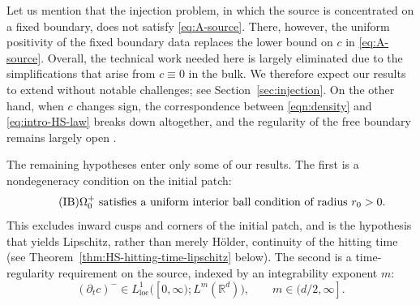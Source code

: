 \documentclass[11pt]{amsart}
\numberwithin{equation}{section}
\numberwithin{figure}{section}
\theoremstyle{plain}
\theoremstyle{definition}
\theoremstyle{remark}
\theoremstyle{plain}
\def\R{\mathbb{R}}
\begin{document}
Let us mention that the injection problem, in which the source is concentrated on a fixed
boundary, does not satisfy \eqref{eq:A-source}. There, however, the uniform positivity of
the fixed boundary data replaces the lower bound on $c$ in \eqref{eq:A-source}. Overall, the technical work needed here is largely eliminated due to the simplifications that arise from \(c\equiv0\) in the bulk. We therefore expect our results to extend
without notable challenges; see Section~\ref{sec:injection}. On the other hand, when $c$ changes sign, the
correspondence between \eqref{eqn:density} and \eqref{eq:intro-HS-law} breaks down
altogether, and the regularity of the free boundary remains largely open \cite{GKM22}. 


The remaining hypotheses enter only some of our results. The first is a
nondegeneracy condition on the initial patch:
\begin{equation*}\tag{IB}\label{eq:A-interior-ball}
    \Omega_0^{+}\hbox{ satisfies a uniform interior ball condition of radius }r_0>0 .
\end{equation*}
This excludes inward cusps and corners of the initial patch, and is the hypothesis
that yields Lipschitz, rather than merely H\"older, continuity of the hitting time
(see Theorem~\ref{thm:HS-hitting-time-lipschitz} below).
The second is a time-regularity requirement on the source, indexed by an integrability
exponent $m$:
\begin{equation*}\tag{S$_m$}\label{eq:A-source-time}
    (\partial_tc)^-\in L^1_{\operatorname{loc}}\bigl([0,\infty);L^m(\R^d)\bigr),
    \qquad m\in(d/2,\infty] .
\end{equation*}
\end{document}
